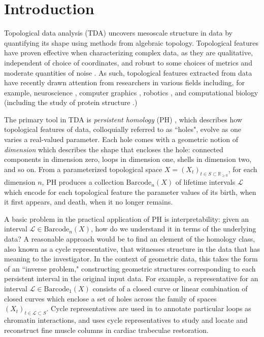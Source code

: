 \documentclass[utf8]{formatting_stuff/frontiersFPHY}
\newcommand{\R}{\mathbb{R}}
\newcommand{\barcode}{\mathrm{Barcode}}
\newcommand{\persinterval}{\mathcal{L}}
\theoremstyle{plain}
\theoremstyle{definition}
\begin{document}

\section{Introduction}
\label{intro}

Topological data analysis (TDA) uncovers 
mesoscale structure in data by quantifying its shape using methods from algebraic topology. 
Topological features have proven effective when characterizing complex data, as they are qualitative, independent of choice of coordinates, and robust to some choices of metrics and moderate quantities of noise \cite{ghrist2014elementary,Carlsson2009TopologyAD}. 
As such, topological features extracted from data have recently drawn attention from researchers in various fields including, for example, neuroscience \cite{giusti2016two, bendich2016persistent, robert}, computer graphics \cite{pointcloud-topo, singh2007topological}, robotics \cite{pathplanning, VASUDEVAN20113292},  and computational biology \cite{collectivemotion, selectingbiologicalexperiments/journal.pone.0213679, zebrafish} (including the study of protein structure   \cite{ Usingpersistenthomologyanddynamicaldistancestoanalyzeproteinbinding,xia2016multiscale,xia2014persistent}.)  

The primary tool in TDA is \textit{persistent homology} (PH) \cite{Ghrist08}, which describes how topological features of data, colloquially referred to as ``holes", evolve as one varies a real-valued parameter. Each hole comes with a geometric notion of  \emph{dimension} which describes the shape that encloses the hole: connected components in dimension zero, loops in dimension one, shells in dimension two, and so on. From a parameterized topological space $X = (X_t)_{t \in S \subset \R_{\ge 0}}$, for each dimension $n$, PH produces a collection $\barcode_n(X)$ of lifetime intervals $\persinterval$ which encode for each topological feature the parameter values of its birth, when it first appears, and death, when it no longer remains.

A basic problem in the practical application of PH is interpretability: given an interval $\persinterval \in \barcode_n(X)$, how do we understand it in terms of the underlying data? A reasonable approach would be to find an element of the homology class, also known as a cycle representative, that  witnesses structure in the data that has meaning to the investigator. In the context of geometric data, this takes the form of an ``inverse problem,"  constructing  geometric structures corresponding to each persistent interval in the original input data.
For example, a representative for an interval $\persinterval \in \barcode_1(X)$ consists of a closed curve or linear combination of closed curves which enclose a set of holes across the family of spaces $(X_t)_{t \in \persinterval \subset S}$. Cycle representatives are used in \cite{emmett2015multiscale} to annotate particular loops as chromatin interactions, and  \cite{wu} uses cycle representatives to study and locate and reconstruct fine muscle columns in  cardiac trabeculae restoration.
\end{document}
